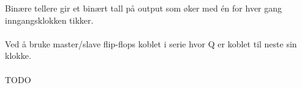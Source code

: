 Binære tellere gir et binært tall på output som øker med én for hver gang
inngangsklokken tikker.
\\\\
Ved å bruke master/slave flip-flops koblet i serie hvor Q er koblet til neste
sin klokke.
\\\\
TODO
